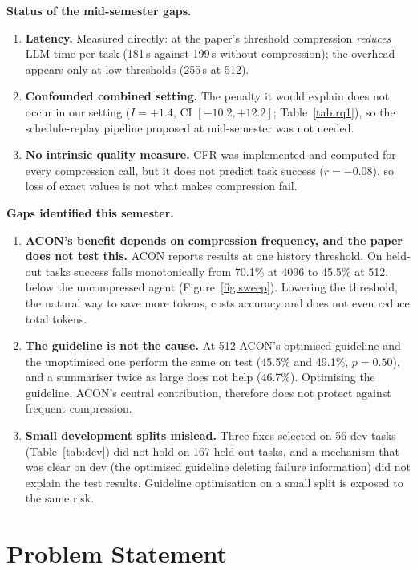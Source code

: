 \documentclass[10pt,a4paper]{article}
\begin{document}
\textbf{Status of the mid-semester gaps.}
\begin{enumerate}[label=(\alph*)]
\item \textbf{Latency.} Measured directly: at the paper's threshold compression
\emph{reduces} LLM time per task (181\,s against 199\,s without compression); the
overhead appears only at low thresholds (255\,s at 512).
\item \textbf{Confounded combined setting.} The penalty it would explain does not
occur in our setting ($I=+1.4$, CI $[-10.2,+12.2]$; Table~\ref{tab:rq1}), so the
schedule-replay pipeline proposed at mid-semester was not needed.
\item \textbf{No intrinsic quality measure.} CFR was implemented and computed for
every compression call, but it does not predict task success ($r=-0.08$), so
loss of exact values is not what makes compression fail.
\end{enumerate}

\textbf{Gaps identified this semester.}
\begin{enumerate}[label=(\alph*),resume]
\item \textbf{ACON's benefit depends on compression frequency, and the paper does
not test this.} ACON reports results at one history threshold. On held-out
tasks success falls monotonically from 70.1\% at 4096 to 45.5\% at 512, below
the uncompressed agent (Figure~\ref{fig:sweep}). Lowering the threshold, the
natural way to save more tokens, costs accuracy and does not even reduce total
tokens.
\item \textbf{The guideline is not the cause.} At 512 ACON's optimised guideline
and the unoptimised one perform the same on test (45.5\% and 49.1\%,
$p=0.50$), and a summariser twice as large does not help (46.7\%). Optimising
the guideline, ACON's central contribution, therefore does not protect against
frequent compression.
\item \textbf{Small development splits mislead.} Three fixes selected on 56 dev
tasks (Table~\ref{tab:dev}) did not hold on 167 held-out tasks, and a mechanism
that was clear on dev (the optimised guideline deleting failure information)
did not explain the test results. Guideline optimisation on a small split is
exposed to the same risk.
\end{enumerate}

\section{Problem Statement}\label{sec:ps}
\end{document}
